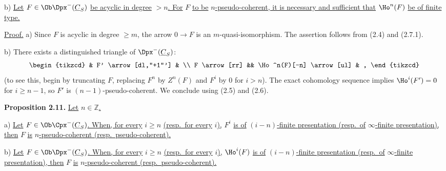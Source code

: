 b) \uline{Let} \(F\in\Ob\Dpx^-(\underline{C}_S)\) \uline{be acyclic in degree} \(>n\)\uline{. For} \(F\) \uline{to be} \(n\)\uline{-pseudo-coherent, it is necessary and sufficient that} \(\Ho^n(F)\) \uline{be of finite type.}

\uline{Proof.} a) Since \(F\) is acyclic in degree \(\geq m\), the arrow \(0\to F\) is an \(m\)-quasi-isomorphism. The assertion follows from (2.4) and (2.7.1).

b) There exists a distinguished triangle of \(\Dpx^-(\underline{C}_S)\):
\[
\begin{tikzcd}
& F' \arrow[dl,"+1"'] & \\
F \arrow[rr] && \Ho^n(F)[-n] \arrow[ul] & ,
\end{tikzcd}
\]
(to see this, begin by truncating \(F\), replacing \(F^n\) by \(Z^n(F)\) and \(F^i\) by \(0\) for \(i>n\)). The exact cohomology sequence implies \(\Ho^i(F')=0\) for \(i\geq n-1\), so \(F'\) is \((n-1)\)-pseudo-coherent. We conclude using (2.5) and (2.6).

\providecommand{\RHom}{\mathrm R\!\Hom}
\providecommand{\Ext}{\operatorname{Ext}}
\providecommand{\coh}{\operatorname{coh}}
\providecommand{\PreCoh}{\operatorname{precoh}}
\providecommand{\Tr}{\operatorname{Tr}}
\providecommand{\Qis}{\operatorname{Qis}}
\providecommand{\Rad}{\operatorname{rad}}
\providecommand{\Spec}{\operatorname{Spec}}
\providecommand{\End}{\operatorname{End}}
\providecommand{\Id}{\operatorname{Id}}
\providecommand{\varinjlim}{\mathop{\mathrm{lim}}\limits_{\longrightarrow}}
\providecommand{\varprojlim}{\mathop{\mathrm{lim}}\limits_{\longleftarrow}}
\providecommand{\qcoh}{\operatorname{qcoh}}
\providecommand{\amp}{\operatorname{amp}}

%
%
\textbf{Proposition 2.11.} \uline{Let} \(n\in\mathbb Z\)\uline{.}

a) \uline{Let} \(F\in\Ob\Cpx^-(\underline{C}_S)\)\uline{. When, for every} \(i\geq n\) \uline{(resp.\ for every} \(i\)\uline{),} \(F^i\) \uline{is of} \((i-n)\)\uline{-finite presentation (resp.\ of} \(\infty\)\uline{-finite presentation), then} \(F\) \uline{is} \(n\)\uline{-pseudo-coherent (resp.\ pseudo-coherent).}

b) \uline{Let} \(F\in\Ob\Dpx^-(\underline{C}_S)\)\uline{. When, for every} \(i\geq n\) \uline{(resp.\ for every} \(i\)\uline{),} \(\Ho^i(F)\) \uline{is of} \((i-n)\)\uline{-finite presentation (resp.\ of} \(\infty\)\uline{-finite presentation), then} \(F\) \uline{is} \(n\)\uline{-pseudo-coherent (resp.\ pseudo-coherent).}

